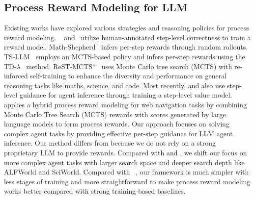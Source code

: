 \subsection{Process Reward Modeling for LLM}
Existing works have explored various strategies and reasoning policies for process reward modeling.
~\cite{mathprocessoutcome} and~\cite{verifystepbystep} utilize human-annotated step-level correctness to train a reward model. Math-Shepherd~\citep{math-shepherd} infers per-step rewards through random rollouts. TS-LLM~\citep{tsllm} employs an MCTS-based policy and infers per-step rewards using the TD-$\lambda$~\citep{sutton1988learning} method. 
ReST-MCTS*~\citep{zhang2024rest-mcts} uses Monte Carlo tree search (MCTS) with re-inforced self-training to enhance the diversity and performance on general reasoning tasks like maths, science, and code.
Most recently, \citet{wang2024q*} and \citet{zhai2024enhancing} also use step-level guidance for agent inference through training a step-level value model. \citet{putta2024agentq} applies a hybrid process reward modeling for web navigation tasks by combining Monte Carlo Tree Search (MCTS) rewards with scores generated by large language models to form process rewards. 
Our approach focuses on solving complex agent tasks by providing effective per-step guidance for LLM agent inference. 
Our method differs from \citet{putta2024agentq} because we do not rely on a strong proprietary LLM to provide rewards. Compared with \citet{wang2024q*} and \citet{zhai2024enhancing}, we shift our focus on more complex agent tasks with larger search space and deeper search depth like ALFWorld and SciWorld. Compared with ~\citet{zhang2024rest-mcts}, our framework is much simpler with less stages of training and more straightforward to make process reward modeling works better compared with strong training-based baselines.

